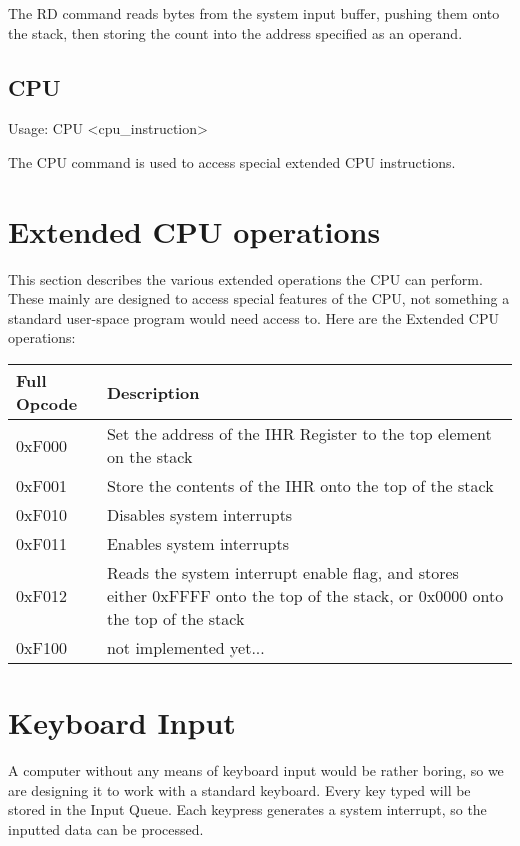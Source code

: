 \documentclass{book}
\begin{document}
  The RD command reads bytes from the system input buffer, pushing them onto the stack, then storing
  the count into the address specified as an operand.

\subsection{CPU}
  Usage: CPU \textless cpu\_instruction\textgreater 

  The CPU command is used to access special extended CPU instructions.

\section{Extended CPU operations}
This section describes the various extended operations the CPU can perform. These mainly are designed
to access special features of the CPU, not something a standard user-space program would need access to.
Here are the Extended CPU operations:

\begin{tabular}{|p{3cm}|p{10cm}|}
  \hline
  \textbf{Full Opcode} & \textbf{Description} \\
  \hline
  0xF000 & Set the address of the IHR Register to the top element on the stack \\
  0xF001 & Store the contents of the IHR onto the top of the stack \\
  0xF010 & Disables system interrupts \\
  0xF011 & Enables system interrupts \\
  0xF012 & Reads the system interrupt enable flag, and stores either 0xFFFF onto the top of the stack, or
           0x0000 onto the top of the stack \\
  0xF100 & not implemented yet... \\
  \hline
\end{tabular}

\section{Keyboard Input}
A computer without any means of keyboard input would be rather boring, so we are designing it to work with
a standard keyboard. Every key typed will be stored in the Input Queue. Each keypress generates a system
interrupt, so the inputted data can be processed.
\end{document}
